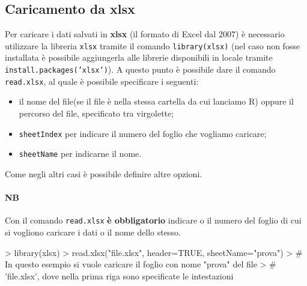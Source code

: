 \documentclass{article}
\begin{document}
\subsection{Caricamento da xlsx}
Per caricare i dati salvati in \textbf{xlsx} (il formato di Excel dal 2007) 
è necessario utilizzare la libreria \texttt{xlsx}
tramite il comando \texttt{library(xlsx)} (nel caso non fosse installata
è possibile aggiungerla alle librerie disponibili in locale tramite 
\texttt{install.packages('xlsx')}). A questo punto è possibile dare il 
comando \texttt{read.xlsx}, al quale è possibile specificare i seguenti:
\begin{itemize}
  \item il nome del file(se il file è nella stessa cartella da cui lanciamo R)
  oppure il percorso del file, specificato tra virgolette;
  \item \texttt{sheetIndex} per indicare il numero del foglio che vogliamo 
  caricare;
  \item \texttt{sheetName} per indicarne il nome.
\end{itemize}
Come negli altri casi è possibile definire altre opzioni.
\paragraph*{NB} Con il comando \texttt{read.xlsx} \textbf{è obbligatorio} 
indicare o il numero del foglio di cui si vogliono caricare i dati o
il nome dello stesso.

\begin{Schunk}
\begin{Sinput}
> library(xlsx)
> read.xlsx("file.xlsx", header=TRUE, sheetName="prova")
> # In questo esempio si vuole caricare il foglio con nome "prova" del file 
> # 'file.xlsx', dove nella prima riga sono specificate le intestazioni
\end{Sinput}
\end{Schunk}
\end{document}
